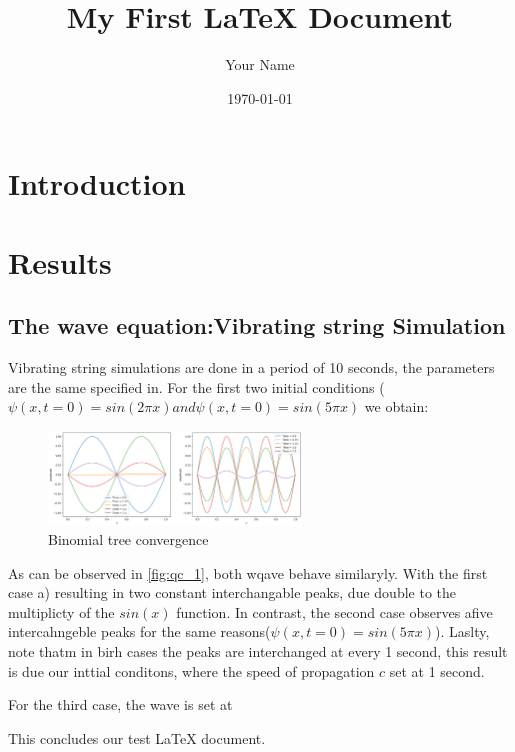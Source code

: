 \documentclass{article}
\begin{document}
\title{My First LaTeX Document}
\author{Your Name}
\date{\today}
\maketitle

\section{Introduction}




\section{Results}
\subsection{The wave equation:Vibrating string Simulation}
Vibrating string simulations are done in a period of 10 seconds, the parameters are the same specified in.
For the first two initial conditions ($\psi(x,t=0) = sin(2 \pi x) and \psi(x,t=0) = sin(5 \pi x)$ we obtain:
\begin{figure}[H]
    \begin{center}
        \includegraphics[width = 0.6\textwidth]{Images/qc_1.png}
        \caption{Binomial tree convergence}
        \label{fig:qc1}
    \end{center}
\end{figure}


As can be observed in \ref{fig:qc_1}, both wqave behave similaryly. With the first case
a) resulting in two constant interchangable peaks, due double to the multiplicty of the $sin(x)$ function.
In contrast, the second case observes afive intercahngeble peaks for the same reasons($\psi(x, t= 0) = sin(5\pi x)$).
Laslty, note thatm in birh cases the peaks are interchanged at every 1 second, this result is due our inttial conditons,
where the speed of propagation $c$ set at 1 second.

For the third case, the wave is set at





This concludes our test LaTeX document.
\end{document}
